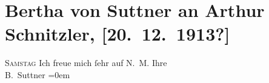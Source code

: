 

         \renewcommand{\erwaehnteOrte}{Orte: Wien}
         \renewcommand{\erwaehnteWerke}{}
               \section[Bertha von Suttner an Arthur Schnitzler, {[}20. 12. 1913?{]}]{ Bertha von Suttner an Arthur Schnitzler, {[}20. 12. 1913?{]}}\nopagebreak{}\rehead{ }\begin{ledgroupsized}[t]{13cm}\normalsize\beginnumbering \toendnotes[C]{\smallbreak\pagebreak[2]} 
\toendnotes[C]{\smallbreak}\pstart
           \raggedleft{}{\pb}\textsc{Samstag}\pend
           \pstart
           Ich freue mich ſehr auf \label{K_L02164-1v}\label{K_L02164-1h}{ }N. M.\pend
           \pstart
           Ihre{\\[\baselineskip]}\spacefill\mbox{B. Suttner}\pend
           \leftskip=0em{}
         
         \endnumbering{}\end{ledgroupsized}  \newcommand{\dateiname}{L02164}\newcommand{\titel}{Bertha von Suttner an Arthur Schnitzler, [20. 12. 1913?]}\newcommand{\editorInnen}{Martin Anton Müller und Gerd-Hermann Susen}
      